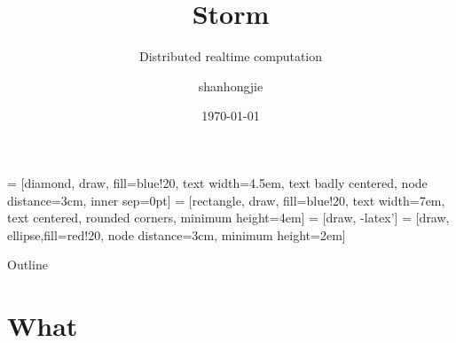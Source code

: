 \documentclass{beamer}
\title[Storm] %
{Storm}
\subtitle{Distributed realtime computation}
\author[shanhongjie] %
{shanhongjie}
\institute[yihaodian] %
{
  IT\_Architecture\_SOA\\
  YHD
}
\date[Short Occasion] %
{\today}
\begin{document}
 = [diamond, draw, fill=blue!20, 
    text width=4.5em, text badly centered, node distance=3cm, inner sep=0pt]
 = [rectangle, draw, fill=blue!20, 
    text width=7em, text centered, rounded corners, minimum height=4em]
 = [draw, -latex']
 = [draw, ellipse,fill=red!20, node distance=3cm,
    minimum height=2em]

\begin{frame}
  \titlepage
\end{frame}

\begin{frame}{Outline}
  \tableofcontents
\end{frame}





\section{What}
\end{document}
